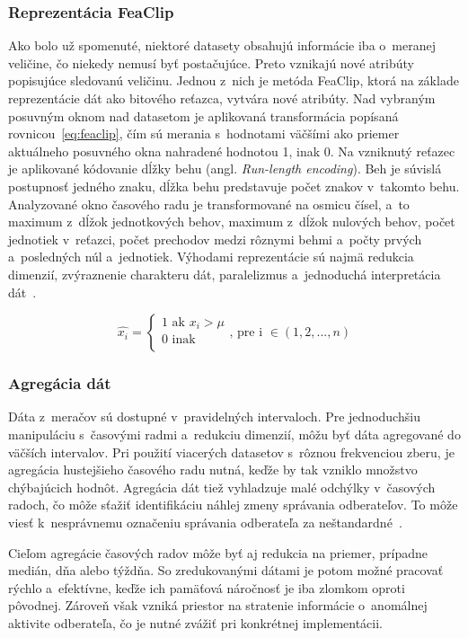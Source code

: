 \documentclass[a4paper,twoside,slovak,12pt,appendix]{article}
\begin{document}
\subsubsection{Reprezentácia FeaClip}
\label{c:feaclip-representation}
Ako bolo už spomenuté, niektoré datasety obsahujú informácie iba o~meranej
veličine, čo niekedy nemusí byť postačujúce. Preto vznikajú nové atribúty
popisujúce sledovanú veličinu. Jednou z~nich je metóda FeaClip, ktorá
na základe reprezentácie dát ako bitového reťazca, vytvára nové atribúty. Nad
vybraným posuvným oknom nad datasetom je aplikovaná transformácia popísaná
rovnicou~\ref{eq:feaclip}, čím sú merania s~hodnotami väčšími ako priemer
aktuálneho posuvného okna nahradené hodnotou 1, inak 0. Na vzniknutý reťazec je
aplikované kódovanie dĺžky behu (angl. \textit{Run-length encoding}). Beh je
súvislá postupnosť jedného znaku, dĺžka behu predstavuje počet znakov v~takomto
behu. Analyzované okno časového radu je transformované na osmicu čísel, a~to
maximum z~dĺžok jednotkových behov, maximum z~dĺžok nulových behov, počet
jednotiek v~reťazci, počet prechodov medzi rôznymi behmi a~počty prvých
a~posledných núl a~jednotiek. Výhodami reprezentácie sú najmä redukcia dimenzií,
zvýraznenie charakteru dát, paralelizmus a~jednoduchá interpretácia
dát~\cite{Laurinec2018}.

\begin{equation}
  \label{eq:feaclip}
  \hat{x_i} =
  \begin{cases}
    1 \text{ ak } x_i > \mu \\
    0 \text{ inak } \\
  \end{cases}
  \text{, pre i } \in (1, 2, ..., n)
\end{equation}

\subsubsection{Agregácia dát}
Dáta z~meračov sú dostupné v~pravidelných intervaloch. Pre jednoduchšiu
manipuláciu s~časovými radmi a~redukciu dimenzií, môžu byť dáta agregované do
väčších intervalov. Pri použití viacerých datasetov s~rôznou frekvenciou zberu,
je agregácia hustejšieho časového radu nutná, keďže by tak vzniklo množstvo
chýbajúcich hodnôt. Agregácia dát tiež vyhladzuje malé odchýlky v~časových
radoch, čo môže sťažiť identifikáciu náhlej zmeny správania odberateľov. To môže
viesť k~nesprávnemu označeniu správania odberateľa za
neštandardné~\cite{Cody2015}.

Cieľom agregácie časových radov môže byť aj redukcia na priemer, prípadne
medián, dňa alebo týždňa. So zredukovanými dátami je potom možné pracovať rýchlo
a~efektívne, keďže ich pamäťová náročnosť je iba zlomkom oproti pôvodnej.
Zároveň však vzniká priestor na stratenie informácie o~anomálnej aktivite
odberateľa, čo je nutné zvážiť pri konkrétnej implementácii.
\end{document}
